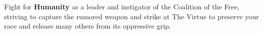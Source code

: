 \documentclass{novanarrative}
\begin{document}
\begin{center}
\begin{minipage}[c]{1in}
\end{minipage}%
\hspace{2em}%
\begin{minipage}[c]{4in}
  Fight for \textbf{Humanity} as a leader and instigator of the
  Coalition of the Free, striving to capture the rumored weapon and
  strike at The Virtue to preserve your race and release many others
  from its oppressive grip.
\end{minipage}

\bigskip
  

\end{center}
\end{document}
